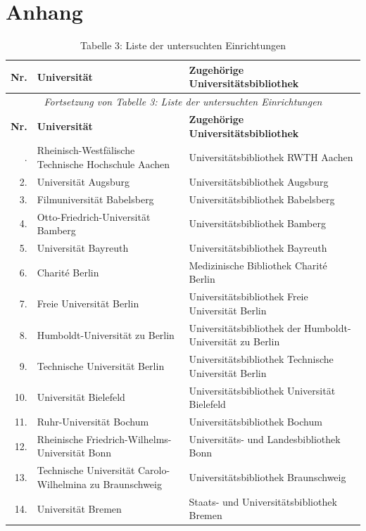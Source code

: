 \documentclass[a4paper,
fontsize=11pt,
oneside,
numbers=noperiodatend,
parskip=half-,
bibliography=totoc,
final
]{scrartcl}
\begin{document}
\hypertarget{anhang}{%
\section{Anhang}\label{anhang}}

\begin{longtable}[l]{rp{7cm}p{7.5cm}}
\caption{Tabelle 3: Liste der untersuchten Einrichtungen} \\
\toprule
\textbf{Nr.} & \textbf{Universität} & \textbf{Zugehörige Universitätsbibliothek} \\
\midrule
\endfirsthead
\multicolumn{3}{c}{\textit{Fortsetzung von Tabelle 3: Liste der untersuchten Einrichtungen}}\\
\toprule
\textbf{Nr.} & \textbf{Universität} & \textbf{Zugehörige Universitätsbibliothek} \\
\midrule
\endhead
\bottomrule
\endfoot
\bottomrule
 \endlastfoot
1. & Rheinisch-Westfälische Technische Hochschule Aachen & Universitätsbibliothek RWTH Aachen \\
2. & Universität Augsburg & Universitätsbibliothek Augsburg \\ 
3. & Filmuniversität Babelsberg & Universitätsbibliothek Babelsberg \\
4. & Otto-Friedrich-Universität Bamberg & Universitätsbibliothek Bamberg \\
5. & Universität Bayreuth & Universitätsbibliothek Bayreuth \\
6. & Charité Berlin & Medizinische Bibliothek Charité Berlin \\
7. & Freie Universität Berlin & Universitätsbibliothek Freie Universität Berlin \\
8. & Humboldt-Universität zu Berlin & Universitätsbibliothek der Humboldt-Universität zu Berlin \\
9. & Technische Universität Berlin & Universitätsbibliothek Technische Universität Berlin \\
10. & Universität Bielefeld & Universitätsbibliothek Universität Bielefeld \\
11. & Ruhr-Universität Bochum & Universitätsbibliothek Bochum \\
12. & Rheinische Friedrich-Wilhelms-Universität Bonn & Universitäts- und Landesbibliothek Bonn \\
13. & Technische Universität Carolo-Wilhelmina zu Braunschweig & Universitätsbibliothek Braunschweig \\
14. & Universität Bremen & Staats- und Universitätsbibliothek Bremen \\

\end{longtable}
\end{document}
